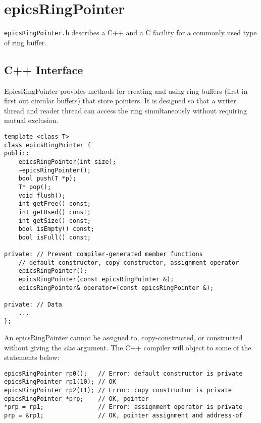 \section{epicsRingPointer}

\verb|epicsRingPointer.h| describes a C++ and a C facility for a commonly used type of ring buffer.

\subsection{C++ Interface}

EpicsRingPointer provides methods for creating and using ring buffers (first in first out circular buffers) that store pointers.
It is designed so that a writer thread and reader thread can access the ring simultaneously without requiring mutual exclusion.

\begin{verbatim}
template <class T>
class epicsRingPointer {
public:
    epicsRingPointer(int size);
    ~epicsRingPointer();
    bool push(T *p);
    T* pop();
    void flush();
    int getFree() const;
    int getUsed() const;
    int getSize() const;
    bool isEmpty() const;
    bool isFull() const;

private: // Prevent compiler-generated member functions
    // default constructor, copy constructor, assignment operator
    epicsRingPointer();
    epicsRingPointer(const epicsRingPointer &);
    epicsRingPointer& operator=(const epicsRingPointer &);

private: // Data
    ...
};
\end{verbatim}

An epicsRingPointer cannot be assigned to, copy-constructed, or constructed without giving the \emph{size} argument.
The C++ compiler will object to some of the statements below:

\begin{verbatim}
epicsRingPointer rp0();   // Error: default constructor is private
epicsRingPointer rp1(10); // OK
epicsRingPointer rp2(t1); // Error: copy constructor is private
epicsRingPointer *prp;    // OK, pointer
*prp = rp1;               // Error: assignment operator is private
prp = &rp1;               // OK, pointer assignment and address-of
\end{verbatim}

